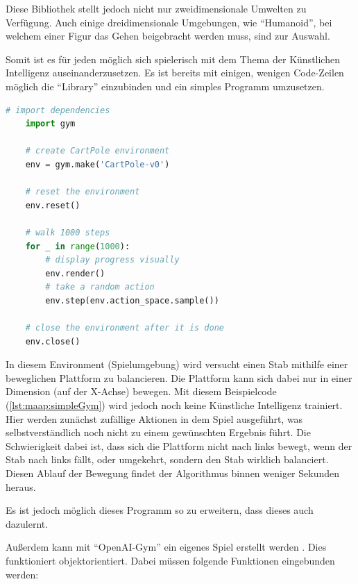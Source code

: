 Diese Bibliothek stellt jedoch nicht nur zweidimensionale Umwelten zu Verfügung. Auch einige dreidimensionale Umgebungen, wie ``Humanoid'', bei welchem einer Figur das Gehen beigebracht werden muss, sind zur Auswahl.

Somit ist es für jeden möglich sich spielerisch mit dem Thema der Künstlichen Intelligenz auseinanderzusetzen. Es ist bereits mit einigen, wenigen Code-Zeilen möglich die ``Library'' einzubinden und ein simples Programm umzusetzen. \cite{ooaigymdocs}
\begin{lstlisting}[language=Python,label=lst:maap:simpleGym,caption=Simples OpenAI-Gym Programm]
    # import dependencies
    import gym 

    # create CartPole environment
    env = gym.make('CartPole-v0') 

    # reset the environment
    env.reset() 

    # walk 1000 steps
    for _ in range(1000): 
        # display progress visually
        env.render() 
        # take a random action
        env.step(env.action_space.sample()) 
        
    # close the environment after it is done
    env.close()
\end{lstlisting}


In diesem Environment (Spielumgebung) wird versucht einen Stab mithilfe einer beweglichen Plattform zu balancieren. Die Plattform kann sich dabei nur in einer Dimension (auf der X-Achse) bewegen. Mit diesem Beispielcode (\ref{lst:maap:simpleGym}) wird jedoch noch keine Künstliche Intelligenz trainiert. Hier werden zunächst zufällige Aktionen in dem Spiel ausgeführt, was selbstverständlich noch nicht zu einem gewünschten Ergebnis führt. Die Schwierigkeit dabei ist, dass sich die Plattform nicht nach links bewegt, wenn der Stab nach links fällt, oder umgekehrt, sondern den Stab wirklich balanciert. Diesen Ablauf der Bewegung findet der Algorithmus binnen weniger Sekunden heraus.

Es ist jedoch möglich dieses Programm so zu erweitern, dass dieses auch dazulernt.

Außerdem kann mit ``OpenAI-Gym'' ein eigenes Spiel erstellt werden \cite{ooaigymdocs}. Dies funktioniert objektorientiert. Dabei müssen folgende Funktionen eingebunden werden:


